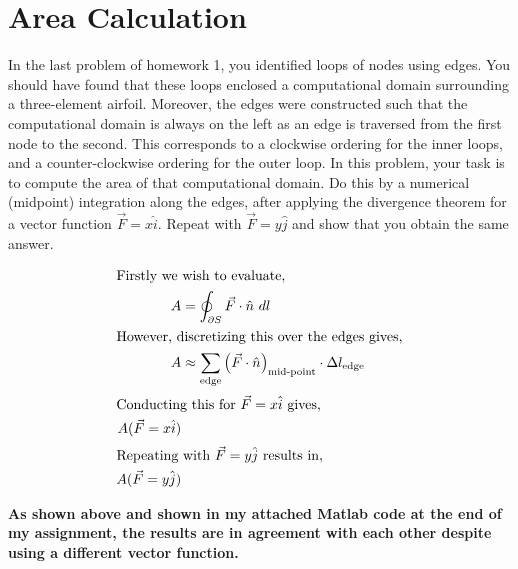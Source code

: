 \pagebreak
\section{Area Calculation}
In the last problem of homework 1, you identified loops of nodes using edges.  You should have found that these loops enclosed a computational domain surrounding a three-element airfoil.  Moreover, the edges were constructed such that the computational domain is always on the left as an edge is traversed from the first node to the second.  This corresponds to a clockwise ordering for the inner loops, and a counter-clockwise ordering for the outer loop.  In this problem,  your task is to compute the area of that computational domain.  Do this by a numerical (midpoint) integration along the edges, after applying the divergence theorem for a vector function $\vec{F} = x\hat{i}$.  Repeat with $\vec{F}=y\hat{j}$ and show that you obtain the same answer.


\begin{adjustwidth}{2.5em}{0pt}
    \begin{align*}
        \shortintertext{Firstly we wish to evaluate,}
        A & = \oint_{\partial S}\vec{F}\cdot \hat{n}\ dl\\
        \shortintertext{However, discretizing this over the edges gives,}
        A & \approx \sum_{\text{edge}} \left(\vec{F}\cdot \hat{n}\right)_{\text{mid-point}}\cdot \Delta l_{\text{edge}}\\
        \shortintertext{Conducting this for $\vec{F} = x\hat{i}$ gives,}
        A(\vec{F} = x\hat{i}) \\
        \shortintertext{Repeating with $\vec{F} = y\hat{j}$ results in,}
        A(\vec{F} = y\hat{j}) 
    \end{align*}

    \begin{fminipage}{0.8\linewidth}
        \textbf{As shown above and shown in my attached Matlab code at the end of my assignment, the results are in agreement with each other despite using a different vector function.}
    \end{fminipage}
\end{adjustwidth}


